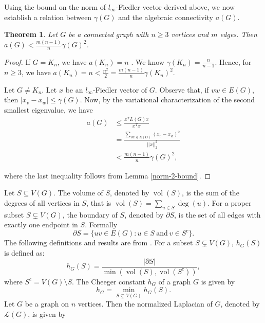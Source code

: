 \documentclass[12pt]{article}
\newtheorem{theorem}{Theorem}[section]
\DeclareMathOperator{\vol}{vol}
\begin{document}
{{			Using the bound on the norm of $l_\infty$-Fiedler vector derived above, we now establish a relation between $\gamma (G)$ and the algebraic connectivity $a(G)$.
			\begin{theorem}\label{a(G)-bound}
				Let $G$ be a connected graph with $n\geq 3$ vertices and $m$ edges. Then $a(G) < \frac{m(n-1)}{n}\gamma(G)^2$.
			\end{theorem}
			\begin{proof}
				If $G=K_n$, we have $a(K_n)=n$ \cite{alg-con}. We know $\gamma(K_n)=\frac{n}{n-1}$. Hence,  for $n \geq 3$, we have 
				$a(K_n)=n<\frac{n^2}{2}=\frac{m(n-1)}{n}\gamma(K_n)^2$.
				
				Let $G \neq K_n$. Let $x$ be an $l_\infty$-Fiedler vector of $G$. Observe that, if $vw\in E(G)$, then $\vert x_v - x_w\vert \leq \gamma(G) $. Now, by the variational characterization of  the second smallest eigenvalue\cite{matrix-analysis}, we have
				\begin{align*}
					a(G) &\leq \frac{x^T L(G) x}{x^Tx}\\&= \frac {\sum\limits_{vw \in E(G)} (x_v-x_w)^2}{\vert \vert x \vert \vert^2 _{2}}\\ &< \frac{m(n-1)}{n}\gamma(G)^2,
				\end{align*}
				
				where the last inequality follows from Lemma \ref{norm-2-bound}.
			\end{proof}
			Let $S \subseteq V(G)$. The volume of $S$, denoted by $\vol(S)$, is the sum of the degrees of all vertices in $S$, that is 
			$\vol(S)=\sum\limits_{u \in S} \deg(u).$  For a proper subset $S \subsetneq  V(G)$, the boundary of $S$, denoted by $ \partial S$, is the set of all edges with exactly one endpoint in $S$. Formally 
			$$\partial S = \biggl\{uv \in E(G) : u \in S ~\mbox{and}~v \in S^c\biggl\}.$$ 
			The following definitions and results are from \cite{chung-book-1997}. For a subset $S \subsetneq V(G)$, $h_G(S)$ is defined as:
			$$
			h_G(S)=\frac{\vert \partial S \vert}{\min(\vol(S),\vol(S^c))},
			$$
			where $S^c = V(G) \setminus S.$
			The Cheeger constant $h_G$ of a graph $G$ is given by 
			$$
			h_G= \min\limits_{S \subsetneq V(G)} h_G(S).
			$$
			Let $G$ be a graph on $n$ vertices. Then the normalized Laplacian of $G$, denoted by $\mathcal{L}(G)$, is given by
			
}}
\end{document}
